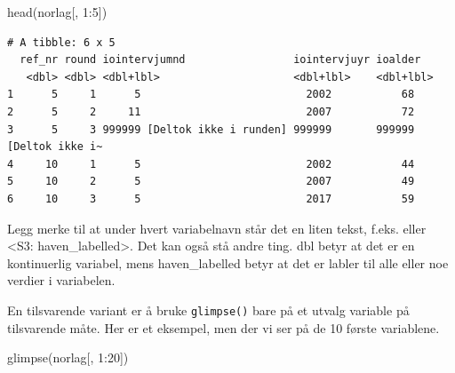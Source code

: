 \documentclass[
  letterpaper,
  DIV=11,
  numbers=noendperiod]{scrreprt}
\newenvironment{Shaded}{\begin{snugshade}}{\end{snugshade}}
\newcommand{\DecValTok}[1]{\textcolor[rgb]{0.68,0.00,0.00}{#1}}
\newcommand{\FunctionTok}[1]{\textcolor[rgb]{0.28,0.35,0.67}{#1}}
\newcommand{\NormalTok}[1]{\textcolor[rgb]{0.00,0.23,0.31}{#1}}
\newcommand{\SpecialCharTok}[1]{\textcolor[rgb]{0.37,0.37,0.37}{#1}}
\begin{document}
\begin{Shaded}
\begin{Highlighting}[]
\FunctionTok{head}\NormalTok{(norlag[, }\DecValTok{1}\SpecialCharTok{:}\DecValTok{5}\NormalTok{])}
\end{Highlighting}
\end{Shaded}

\begin{verbatim}
# A tibble: 6 x 5
  ref_nr round iointervjumnd                 iointervjuyr ioalder               
   <dbl> <dbl> <dbl+lbl>                     <dbl+lbl>    <dbl+lbl>             
1      5     1      5                          2002           68                
2      5     2     11                          2007           72                
3      5     3 999999 [Deltok ikke i runden] 999999       999999 [Deltok ikke i~
4     10     1      5                          2002           44                
5     10     2      5                          2007           49                
6     10     3      5                          2017           59                
\end{verbatim}

Legg merke til at under hvert variabelnavn står det en liten tekst,
f.eks. eller \textless S3: haven\_labelled\textgreater. Det kan også stå
andre ting. dbl betyr at det er en kontinuerlig variabel, mens
haven\_labelled betyr at det er labler til alle eller noe verdier i
variabelen.

En tilsvarende variant er å bruke \texttt{glimpse()} bare på et utvalg
variable på tilsvarende måte. Her er et eksempel, men der vi ser på de
10 første variablene.

\begin{Shaded}
\begin{Highlighting}[]
\FunctionTok{glimpse}\NormalTok{(norlag[, }\DecValTok{1}\SpecialCharTok{:}\DecValTok{20}\NormalTok{])}
\end{Highlighting}
\end{Shaded}
\end{document}
